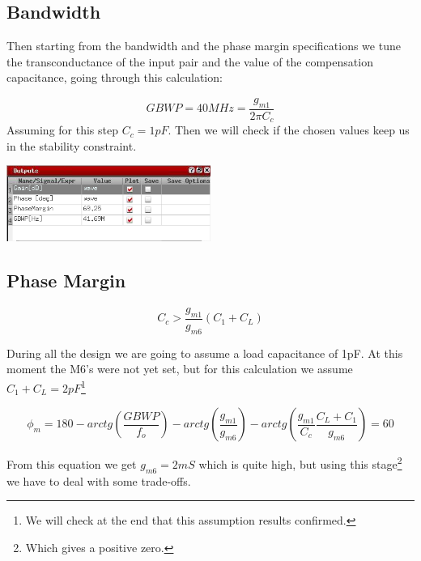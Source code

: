 
\subsection{Bandwidth} %
\label{subsec:bandwidth}



Then starting from the bandwidth and the phase margin specifications we tune the transconductance of the input pair and the value of the compensation capacitance, going through this calculation:

\begin{equation}
	GBWP=40MHz=\frac{g_{m1}}{2 \pi C_c}
\end{equation}
Assuming for this step $C_c = 1pF$.
Then we will check if the chosen values keep us in the stability constraint.



\centering
\includegraphics[width=0.5\textwidth]{Capitoli/gainprimo.png}
\raggedright


\subsection{Phase Margin} %
\label{subsec:phase_margin}

\begin{equation}
	C_c> \frac{g_{m1}}{g_{m6}}(C_1+C_L)
\end{equation}

During all the design we are going to assume a load capacitance of 1pF.
At this moment the M6's were not yet set, but for this calculation we assume $C_1+C_L=2pF$\footnote{We will check at the end that this assumption results confirmed.}

\begin{equation}
	\phi_m=180- arctg(\frac {GBWP} {f_o} )-arctg(\frac { g_{m1} }{ g_{m6}})-arctg(\frac{g_{m1}} {C_c}\frac{C_L+C_1}{g_{m6}})=60 
\end{equation}

From this equation we get $g_{m6} = 2mS $ which is quite high, but using this stage\footnote{Which gives a positive zero.} we have to deal with some trade-offs.

